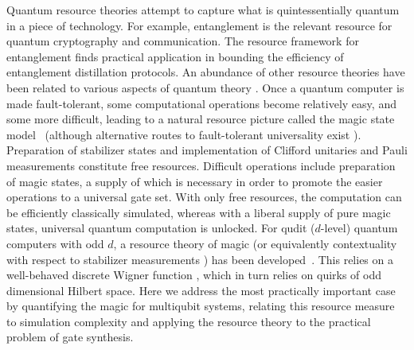 \documentclass[aps,prl,twocolumn,showpacs,superscriptaddress,groupedaddress,amsmath,amssymb]{revtex4-1}  %
\begin{document}
Quantum resource theories attempt to capture what is quintessentially quantum in a piece of technology. For example, entanglement is the relevant resource for quantum cryptography and communication. The resource framework for entanglement finds practical application in bounding the efficiency of entanglement distillation protocols. An abundance of other resource theories have been related to various aspects of quantum theory \cite{brandao_reversible_2015,coecke_mathematical_2016,grudka_quantifying_2014,Horodecki:2013,napoli_robustness_2016,stahlke_quantum_2014,veitch_resource_2014,vidal_robustness_1999}. Once a quantum computer is made fault-tolerant, some computational operations become relatively easy, and some more difficult, leading to a natural resource picture called the magic state model~\cite{bravyi_universal_2005,knill_quantum_2005} (although alternative routes to fault-tolerant universality exist \cite{campbell_steep_2016}). Preparation of stabilizer states and implementation of Clifford unitaries and Pauli measurements constitute free resources. Difficult operations include preparation of  magic states, a supply of which is necessary in order to promote the easier operations to a universal gate set.   With only free resources, the computation can be efficiently classically simulated, whereas with a liberal supply of pure magic states, universal quantum computation is unlocked.    For qudit ($d$-level) quantum computers with odd $d$, a resource theory of magic (or equivalently contextuality with respect to stabilizer measurements \cite{howard_contextuality_2014,delfosse_equivalence_2016}) has been developed~\cite{veitch_negative_2012,mari_positive_2012,veitch_resource_2014}. This relies on a well-behaved discrete Wigner function \cite{gross_hudsons_2006}, which in turn relies on quirks of odd dimensional Hilbert space. Here we address the most practically important case by quantifying the magic for multiqubit systems, relating this resource measure to simulation complexity and applying the resource theory to the practical problem of gate synthesis. 
\end{document}

